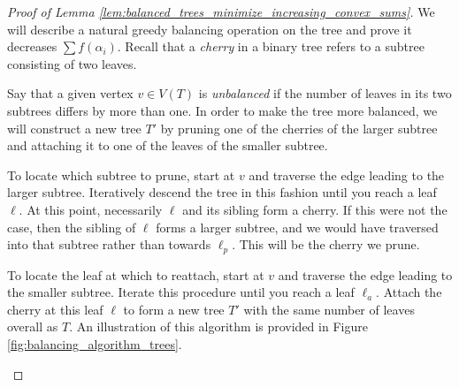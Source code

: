 \documentclass[10pt,a4paper]{amsart}
\begin{document}
\begin{proof}[Proof of Lemma \ref{lem:balanced_trees_minimize_increasing_convex_sums}]
\noindent We will describe a natural greedy balancing operation on the tree and prove it decreases $\sum f(\alpha_i)$. Recall that a \textit{cherry} in a binary tree refers to a subtree consisting of two leaves.

Say that a given vertex $v \in V(T)$ is \textit{unbalanced} if the number of leaves in its two subtrees differs by more than one. In order to make the tree more balanced, we will construct a new tree $T'$ by pruning one of the cherries of the larger subtree and attaching it to one of the leaves of the smaller subtree.

To locate which subtree to prune, start at $v$ and traverse the edge leading to the larger subtree. Iteratively descend the tree in this fashion until you reach a leaf $\ell$. At this point, necessarily $\ell$ and its sibling form a cherry. If this were not the case, then the sibling of $\ell$ forms a larger subtree, and we would have traversed into that subtree rather than towards $\ell_p$. This will be the cherry we prune. 

To locate the leaf at which to reattach, start at $v$ and traverse the edge leading to the smaller subtree. Iterate this procedure until you reach a leaf $\ell_a$. Attach the cherry at this leaf $\ell$ to form a new tree $T'$ with the same number of leaves overall as $T$. An illustration of this algorithm is provided in Figure \ref{fig:balancing_algorithm_trees}. 

\begin{figure}[h]
\centering
\begin{minipage}{0.48\textwidth}
\centering
\end{minipage}
\end{figure}
\end{proof}
\end{document}
